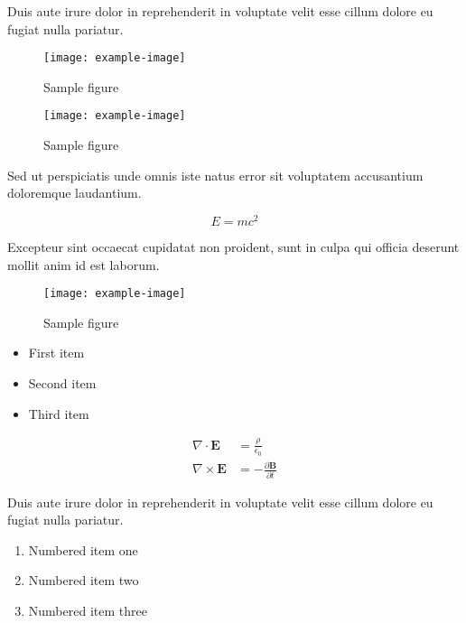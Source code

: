 \documentclass{article}
\begin{document}
Duis aute irure dolor in reprehenderit in voluptate velit esse cillum dolore eu fugiat nulla pariatur.

\begin{figure}[h]
    \centering
    \texttt{[image: example-image]}
    \caption{Sample figure}
    \label{fig:sample}
\end{figure}

\begin{figure}[h]
    \centering
    \texttt{[image: example-image]}
    \caption{Sample figure}
    \label{fig:sample}
\end{figure}

Sed ut perspiciatis unde omnis iste natus error sit voluptatem accusantium doloremque laudantium.

\begin{equation}
    E = mc^2
\end{equation}

Excepteur sint occaecat cupidatat non proident, sunt in culpa qui officia deserunt mollit anim id est laborum.

\begin{figure}[h]
    \centering
    \texttt{[image: example-image]}
    \caption{Sample figure}
    \label{fig:sample}
\end{figure}


\begin{itemize}
\item First item
\item Second item
\item Third item
\end{itemize}

\begin{align}
    \nabla \cdot \mathbf{E} &= \frac{\rho}{\epsilon_0} \\
    \nabla \times \mathbf{E} &= -\frac{\partial \mathbf{B}}{\partial t}
\end{align}


Duis aute irure dolor in reprehenderit in voluptate velit esse cillum dolore eu fugiat nulla pariatur.

\begin{enumerate}
\item Numbered item one
\item Numbered item two
\item Numbered item three
\end{enumerate}
\end{document}
